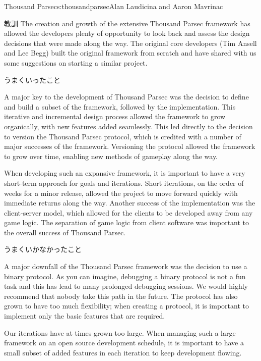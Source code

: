 \begin{aosachapter}{Thousand Parsec}{s:thousandparsec}{Alan Laudicina and Aaron Mavrinac}
\begin{aosasect1}{教訓}
The creation and growth of the extensive Thousand Parsec framework has
allowed the developers plenty of opportunity to look back and assess
the design decisions that were made along the way. The original core
developers (Tim Ansell and Lee Begg) built the original framework from
scratch and have shared with us some suggestions on starting a similar
project.

\begin{aosasect2}{うまくいったこと}

A major key to the development of Thousand Parsec was the decision to
define and build a subset of the framework, followed by the
implementation. This iterative and incremental design process allowed
the framework to grow organically, with new features added
seamlessly. This led directly to the decision to version the
Thousand Parsec protocol, which is credited with a number of major
successes of the framework. Versioning the protocol allowed the
framework to grow over time, enabling new methods of gameplay along
the way.

When developing such an expansive framework, it is important to have a
very short-term approach for goals and iterations. Short iterations, on the order of weeks for a minor release,
allowed the project to move forward quickly with immediate returns
along the way. Another success of the
implementation was the client-server model, which allowed for the
clients to be developed away from any game logic. The separation of
game logic from client software was important to the overall success
of Thousand Parsec.

\end{aosasect2}

\begin{aosasect2}{うまくいかなかったこと}

A major downfall of the Thousand Parsec framework was the decision to
use a binary protocol. As you can imagine, debugging a binary protocol
is not a fun task and this has lead to many prolonged debugging
sessions. We would highly recommend that nobody take this path in the
future. The protocol has also grown to have too much flexibility; when
creating a protocol, it is important to implement only the basic
features that are required.

Our iterations have at times grown too large. When managing such a
large framework on an open source development schedule, it is
important to have a small subset of added features in each iteration
to keep development flowing.


\end{aosasect2}
\end{aosasect1}
\end{aosachapter}
